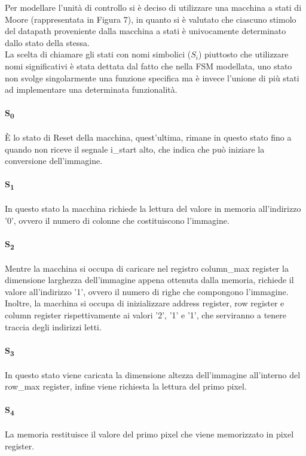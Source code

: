 Per modellare l'unità di controllo si è deciso di utilizzare una macchina a stati di Moore (rappresentata in Figura 7), in quanto si è valutato che ciascuno stimolo del datapath proveniente dalla macchina a stati è univocamente determinato dallo stato della stessa.\\
La scelta di chiamare gli stati con nomi simbolici ($S_i$) piuttosto che utilizzare nomi significativi è stata dettata dal fatto che nella FSM modellata, uno stato non svolge singolarmente una funzione specifica ma è invece l'unione di più stati ad implementare una determinata funzionalità.

\newpage

\paragraph{S\textsubscript{0}}
È lo stato di Reset della macchina, quest'ultima, rimane in questo stato fino a quando non riceve il segnale i\_start alto, che indica che può iniziare la conversione dell'immagine.
\paragraph{S\textsubscript{1}}
In questo stato la macchina richiede la lettura del valore in memoria all'indirizzo '0', ovvero il numero di colonne che costituiscono l'immagine.
\paragraph{S\textsubscript{2}}
Mentre la macchina si occupa di caricare nel registro column\_max register la dimensione larghezza dell'immagine appena ottenuta dalla memoria, richiede il valore all'indirizzo '1', ovvero il numero di righe che compongono l'immagine. Inoltre, la macchina si occupa di inizializzare address register, row register e column register rispettivamente ai valori '2', '1' e '1', che serviranno a tenere traccia degli indirizzi letti.
\paragraph{S\textsubscript{3}}
In questo stato viene caricata la dimensione altezza dell'immagine all'interno del row\_max register, infine viene richiesta la lettura del primo pixel.
\paragraph{S\textsubscript{4}}
La memoria restituisce il valore del primo pixel che viene memorizzato in pixel register.

